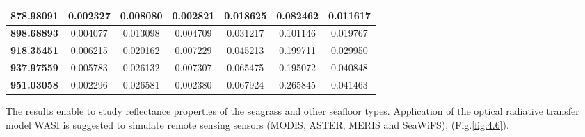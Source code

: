 \documentclass[10pt, a4paper]{article}
\begin{document}
\begin{table}[htbp]
\begin{center}
\begin{tabular}{|c|c|c|c|c|c|c|}
		\textbf{878.98091} & 0.002327 & 0.008080 & 0.002821 & 0.018625 & 0.082462 & 0.011617 \\ \hline
		\textbf{898.68893} & 0.004077 & 0.013098 & 0.004709 & 0.031217 & 0.101146 & 0.019767 \\ \hline
		\textbf{918.35451} & 0.006215 & 0.020162 & 0.007229 & 0.045213 & 0.199711 & 0.029950 \\ \hline
		\textbf{937.97559} & 0.005783 & 0.026132 & 0.007307 & 0.065475 & 0.195072 & 0.040848 \\ \hline
		\textbf{951.03058} & 0.002296 & 0.026581 & 0.002380 & 0.067924 & 0.265845 & 0.041463 \\ \hline
	\end{tabular}
	\end{center}
\end{table}

The results enable to study reflectance properties of the seagrass and other
seafloor types. Application of the optical radiative transfer model WASI is suggested to simulate
remote sensing sensors (MODIS, ASTER, MERIS and SeaWiFS), (Fig.\ref{fig:4.6}).
\end{document}
